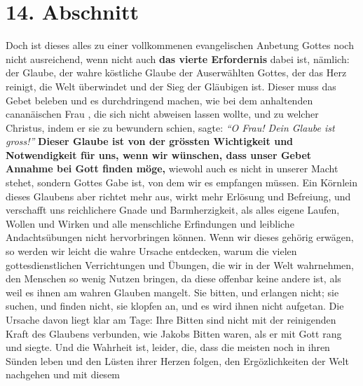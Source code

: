 \section{14. Abschnitt} \label{kap6_ab14}

Doch ist dieses alles zu einer vollkommenen evangelischen Anbetung Gottes noch
nicht ausreichend, wenn nicht auch \textbf{das vierte Erfordernis} dabei ist,
nämlich:
der Glaube, der wahre köstliche Glaube der Auserwählten Gottes, der das Herz
reinigt, die Welt überwindet und der Sieg der Gläubigen ist.
Dieser muss das
Gebet beleben und es durchdringend machen, wie bei dem anhaltenden cananäischen
Frau
, die sich
nicht abweisen lassen wollte, und zu welcher Christus, indem er
sie zu bewundern schien, sagte:
\textit{"`O Frau! Dein Glaube ist gross!"'}
\textbf{Dieser Glaube ist von der grössten
Wichtigkeit
und Notwendigkeit für uns, wenn wir wünschen, dass unser Gebet Annahme bei Gott
finden möge,} wiewohl auch es nicht in unserer Macht stehet, sondern Gottes Gabe
ist, von dem wir es empfangen müssen. Ein Körnlein dieses Glaubens aber richtet
mehr aus, wirkt mehr Erlösung und Befreiung, und verschafft uns
reichlichere
Gnade und Barmherzigkeit, als alles eigene Laufen, Wollen und Wirken und alle
menschliche Erfindungen und leibliche Andachtsübungen nicht hervorbringen
können. Wenn wir dieses gehörig erwägen, so werden wir leicht die wahre Ursache
entdecken, warum die vielen gottesdienstlichen Verrichtungen und Übungen, die
wir in der Welt wahrnehmen, den Menschen so wenig Nutzen bringen, da diese
offenbar keine andere ist, als weil es ihnen am wahren Glauben mangelt. Sie
bitten, und erlangen nicht;
sie suchen, und finden nicht, sie
klopfen an, und es wird ihnen nicht aufgetan. Die Ursache davon liegt klar am
Tage: Ihre Bitten sind nicht mit der reinigenden Kraft des Glaubens verbunden,
wie Jakobs Bitten waren, als er mit Gott rang und
siegte. Und die Wahrheit
ist, leider, die, dass die meisten noch in ihren Sünden leben und den Lüsten
ihrer Herzen folgen, den Ergözlichkeiten der Welt nachgehen und mit diesem
